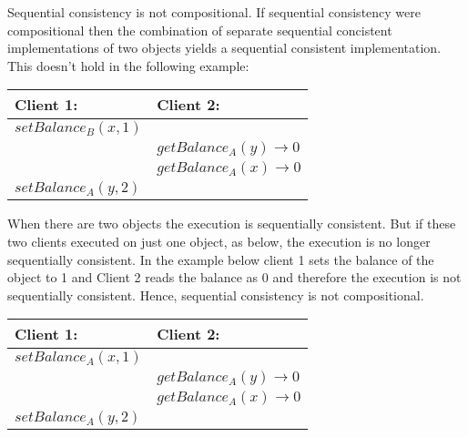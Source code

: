 \documentclass[a4paper]{article}
\newcommand{\question}[2][]{
  \parbox[t]{\textwidth}{
    \ifthenelse{\equal{#1}{}}{}{#1)}
    \parbox[t]{0.95\textwidth}{#2}}\\}
\newcommand{\solution}[2][]{
  \ifthenelse{\equal{#1}{} \or \equal{#1}{a}}{\\[3pt]\textit{Solution: }\\[0.1cm]}{}
  \question[#1]{#2}
}
\begin{document}
\solution[b]{
  Sequential consistency is not compositional. If sequential consistency
  were compositional then the combination of separate sequential
  concistent implementations of two objects yields a sequential
  consistent implementation. This doesn't hold in the following example:
  \begin{center}
    \begin{tabular}{| l | l |}\hline
      Client 1: & Client 2: \\\hline
      $setBalance_B(x, 1)$ &\\
      & $getBalance_A(y) \rightarrow 0$\\
      & $getBalance_A(x) \rightarrow 0$\\
      $setBalance_A(y, 2)$ &\\\hline
    \end{tabular}
  \end{center}
  When there are two objects the execution is sequentially
  consistent. But if these two clients executed on just one object, as
  below, the execution is no longer sequentially consistent. In the
  example below client 1 sets the balance of the object to 1 and Client
  2 reads the balance as 0 and therefore the execution is not
  sequentially consistent. Hence, sequential consistency is not
  compositional.
  \begin{center}
    \begin{tabular}{| l | l |}\hline
      Client 1: & Client 2: \\\hline
      $setBalance_A(x, 1)$ &\\
      & $getBalance_A(y) \rightarrow 0$\\
      & $getBalance_A(x) \rightarrow 0$\\
      $setBalance_A(y, 2)$ &\\\hline
    \end{tabular}
  \end{center}
}
\end{document}
